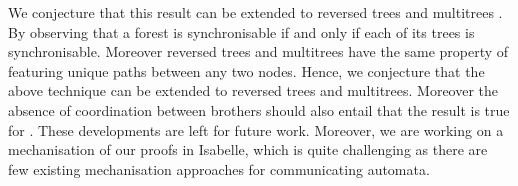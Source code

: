 \documentclass[submission,copyright,creativecommons,UKenglish]{eptcs}
\begin{document}
We conjecture that this result can be extended to reversed trees and multitrees \cite{furnas_multitrees_1994}. By observing that 
a forest is synchronisable if and only if each of its trees is synchronisable. 
Moreover reversed trees and multitrees have the same property of featuring  unique paths between any two nodes.
Hence, we conjecture that the above technique can be extended to reversed trees and multitrees.
Moreover the absence of coordination between brothers should also entail that the result is true for \Ptp.
These developments are left for future work.
Moreover, we are working on a mechanisation of our proofs in Isabelle, which is quite challenging as there are few existing mechanisation approaches for communicating automata.










%
\end{document}
